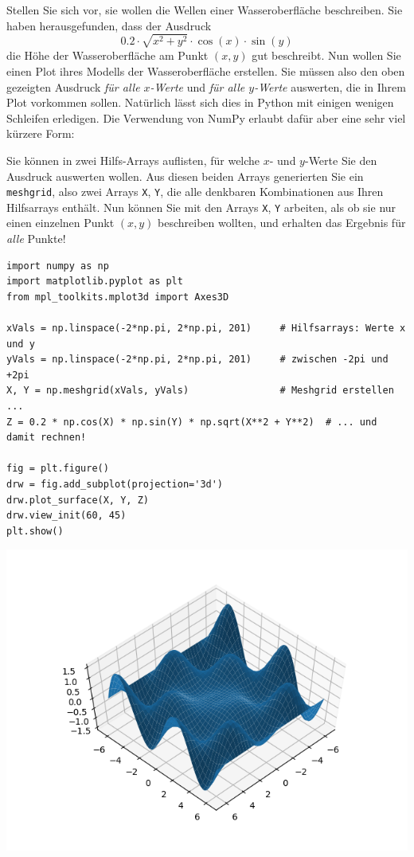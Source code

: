 Stellen Sie sich vor, sie wollen die Wellen einer Wasseroberfläche beschreiben. Sie haben herausgefunden, dass der Ausdruck
\[ 0.2 \cdot \sqrt{x^2 + y^2} \cdot \cos(x) \cdot \sin(y) \]
die Höhe der Wasseroberfläche am Punkt $(x, y)$ gut beschreibt. Nun wollen Sie einen Plot ihres Modells der Wasseroberfläche erstellen. Sie müssen also den oben gezeigten Ausdruck \emph{für alle $x$-Werte} und \emph{für alle $y$-Werte} auswerten, die in Ihrem Plot vorkommen sollen. Natürlich lässt sich dies in Python mit einigen wenigen Schleifen erledigen. Die Verwendung von NumPy erlaubt dafür aber eine sehr viel kürzere Form:

Sie können in zwei Hilfs-Arrays auflisten, für welche $x$- und $y$-Werte Sie den Ausdruck auswerten wollen. Aus diesen beiden Arrays generierten Sie ein \texttt{meshgrid}, also zwei Arrays \texttt{X}, \texttt{Y}, die alle denkbaren Kombinationen aus Ihren Hilfsarrays enthält. Nun können Sie mit den Arrays \texttt{X}, \texttt{Y} arbeiten, als ob sie nur einen einzelnen Punkt $(x, y)$ beschreiben wollten, und erhalten das Ergebnis für \emph{alle} Punkte!

\begin{codebox}
\begin{verbatim}
import numpy as np
import matplotlib.pyplot as plt
from mpl_toolkits.mplot3d import Axes3D

xVals = np.linspace(-2*np.pi, 2*np.pi, 201)     # Hilfsarrays: Werte x und y
yVals = np.linspace(-2*np.pi, 2*np.pi, 201)     # zwischen -2pi und +2pi
X, Y = np.meshgrid(xVals, yVals)                # Meshgrid erstellen ...
Z = 0.2 * np.cos(X) * np.sin(Y) * np.sqrt(X**2 + Y**2)  # ... und damit rechnen!

fig = plt.figure()
drw = fig.add_subplot(projection='3d')
drw.plot_surface(X, Y, Z)
drw.view_init(60, 45)
plt.show()
\end{verbatim}
\end{codebox}
%
\begin{tcolorbox}[title=Ausgabe: Wellen auf Wasser]
\begin{center}
	\includegraphics[width=.6\linewidth]{./gfx/np-wave}
\end{center}
\end{tcolorbox}

